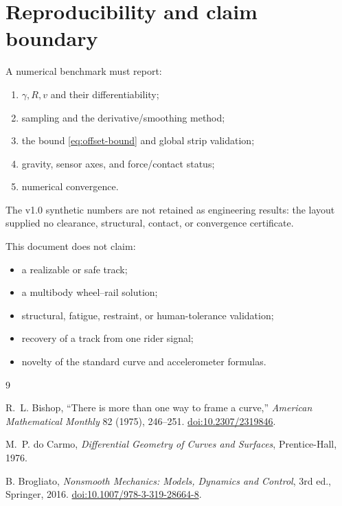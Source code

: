 \documentclass[11pt,a4paper]{article}
\theoremstyle{definition}
\theoremstyle{plain}
\theoremstyle{remark}
\begin{document}
\section{Reproducibility and claim boundary}

A numerical benchmark must report:
\begin{enumerate}[label=(\roman*)]
  \item \(\gamma,R,v\) and their differentiability;
  \item sampling and the derivative/smoothing method;
  \item the bound \cref{eq:offset-bound} and global strip validation;
  \item gravity, sensor axes, and force/contact status;
  \item numerical convergence.
\end{enumerate}
The v1.0 synthetic numbers are not retained as engineering results:
the layout supplied no clearance, structural, contact, or convergence
certificate.

This document does not claim:
\begin{itemize}
  \item a realizable or safe track;
  \item a multibody wheel--rail solution;
  \item structural, fatigue, restraint, or human-tolerance validation;
  \item recovery of a track from one rider signal;
  \item novelty of the standard curve and accelerometer formulas.
\end{itemize}

\begin{thebibliography}{9}

R.~L. Bishop, ``There is more than one way to frame a curve,''
\emph{American Mathematical Monthly} 82 (1975), 246--251.
\href{https://doi.org/10.2307/2319846}{doi:10.2307/2319846}.

M.~P. do Carmo, \emph{Differential Geometry of Curves and Surfaces},
Prentice-Hall, 1976.

B. Brogliato, \emph{Nonsmooth Mechanics: Models, Dynamics and
Control}, 3rd ed., Springer, 2016.
\href{https://doi.org/10.1007/978-3-319-28664-8}
{doi:10.1007/978-3-319-28664-8}.

\end{thebibliography}
\end{document}
